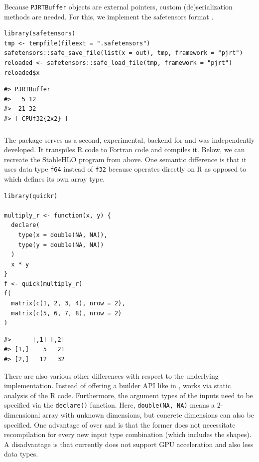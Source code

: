 Because \texttt{PJRTBuffer} objects are external pointers, custom (de)serialization methods are needed.
For this, we implement the safetensors format \citep{ref-safetensors}.

\begin{verbatim}
library(safetensors)
tmp <- tempfile(fileext = ".safetensors")
safetensors::safe_save_file(list(x = out), tmp, framework = "pjrt")
reloaded <- safetensors::safe_load_file(tmp, framework = "pjrt")
reloaded$x
\end{verbatim}

\begin{verbatim}
#> PJRTBuffer 
#>   5 12
#>  21 32
#> [ CPUf32{2x2} ]
\end{verbatim}

\subsubsection{\texorpdfstring{}{}}\label{section}

The  package serves as a second, experimental, backend for  and was independently developed.
It transpiles R code to Fortran code and compiles it.
Below, we can recreate the StableHLO program from above.
One semantic difference is that it uses data type \texttt{f64} instead of \texttt{f32} because  operates directly on R as opposed to  which defines its own array type.

\begin{verbatim}
library(quickr)

multiply_r <- function(x, y) {
  declare(
    type(x = double(NA, NA)),
    type(y = double(NA, NA))
  )
  x * y
}
f <- quick(multiply_r)
f(
  matrix(c(1, 2, 3, 4), nrow = 2),
  matrix(c(5, 6, 7, 8), nrow = 2)
)
\end{verbatim}

\begin{verbatim}
#>      [,1] [,2]
#> [1,]    5   21
#> [2,]   12   32
\end{verbatim}

There are also various other differences with respect to the underlying implementation.
Instead of offering a builder API like in ,  works via static analysis of the R code.
Furthermore, the argument types of the inputs need to be specified via the \texttt{declare()} function.
Here, \texttt{double(NA,\ NA)} means a 2-dimensional array with unknown dimensions, but concrete dimensions can also be specified.
One advantage of  over  and  is that the former does not necessitate recompilation for every new input type combination (which includes the shapes).
A disadvantage is that  currently does not support GPU acceleration and also less data types.

